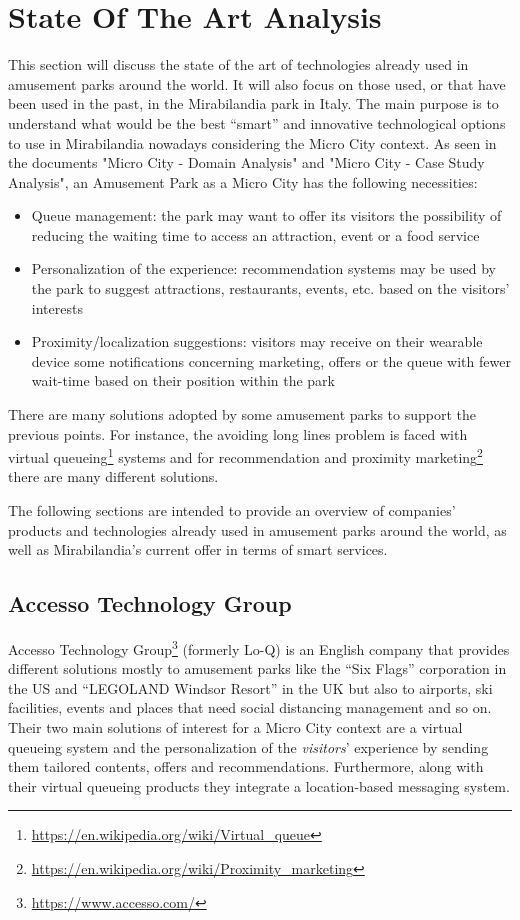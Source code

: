 \section{State Of The Art Analysis}\label{sec:state-of-the-art-analysis}
This section will discuss the state of the art of technologies already used in amusement parks around the world.
It will also focus on those used, or that have been used in the past, in the Mirabilandia park in Italy.
The main purpose is to understand what would be the best ``smart'' and innovative technological options to use in Mirabilandia nowadays considering the Micro City context.
As seen in the documents "Micro City - Domain Analysis" and "Micro City - Case Study Analysis", an Amusement Park as a Micro City has the following necessities:
\begin{itemize}
    \item Queue management: the park may want to offer its visitors the possibility of reducing the waiting time to access an attraction, event or a food service
    \item Personalization of the experience: recommendation systems may be used by the park to suggest attractions, restaurants, events, etc. based on the visitors' interests
    \item Proximity/localization suggestions: visitors may receive on their wearable device some notifications concerning marketing, offers or the queue with fewer wait-time based on their position within the park
\end{itemize}

There are many solutions adopted by some amusement parks to support the previous points.
For instance, the avoiding long lines problem is faced with virtual queueing\footnote{\url{https://en.wikipedia.org/wiki/Virtual_queue}} systems
and for recommendation and proximity marketing\footnote{\url{https://en.wikipedia.org/wiki/Proximity_marketing}} there are many different solutions.

The following sections are intended to provide an overview of companies' products and technologies already used in amusement parks around the world,
as well as Mirabilandia's current offer in terms of smart services.

\subsection{Accesso Technology Group}\label{subsec:accesso-technology-group}
Accesso Technology Group\footnote{\url{https://www.accesso.com/}} (formerly Lo-Q) is an English company that provides different solutions
mostly to amusement parks like the ``Six Flags'' corporation in the US and ``LEGOLAND Windsor Resort'' in the UK but also to airports,
ski facilities, events and places that need social distancing management and so on.
Their two main solutions of interest for a Micro City context are a virtual queueing system and the personalization of
the \textit{visitors}' experience by sending them tailored contents, offers and recommendations.
Furthermore, along with their virtual queueing products they integrate a location-based messaging system.

